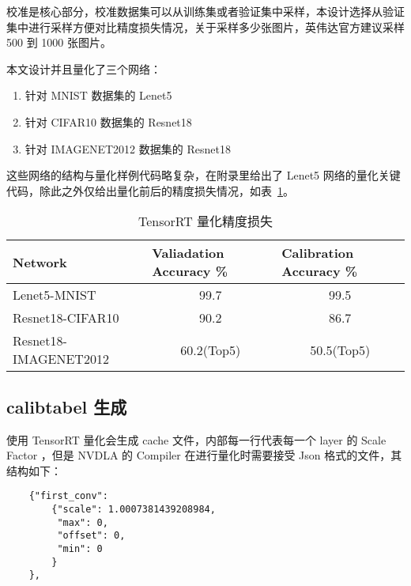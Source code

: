 校准是核心部分，校准数据集可以从训练集或者验证集中采样，本设计选择从验证集中进行采样方便对比精度损失情况，关于采样多少张图片，英伟达官方建议采样 500 到 1000 张图片。

本文设计并且量化了三个网络：

\begin{enumerate}
    \item 针对 MNIST 数据集的 Lenet5
    \item 针对 CIFAR10 数据集的 Resnet18
    \item 针对 IMAGENET2012 数据集的 Resnet18
\end{enumerate}

这些网络的结构与量化样例代码略复杂，在附录里给出了 Lenet5 网络的量化关键代码，除此之外仅给出量化前后的精度损失情况，如表~\ref{tab:Qualifications Report}。

\begin{table}[!htbp]
    \caption{TensorRT 量化精度损失}
    \label{tab:Qualifications Report}
    \centering
    \footnotesize%
    \setlength{\tabcolsep}{4pt}%
    \renewcommand{\arraystretch}{1.2}%
    \begin{tabular}{lcc}
        \toprule
        \textbf{Network}      & \multicolumn{1}{l}{\textbf{Valiadation Accuracy \%}} & \multicolumn{1}{l}{\textbf{Calibration Accuracy \%}} \\
        \midrule
        Lenet5-MNIST          & 99.7                                                 & 99.5                                                 \\
        Resnet18-CIFAR10      & 90.2                                                 & 86.7                                                 \\
        Resnet18-IMAGENET2012 & 60.2(Top5)                                           & 50.5(Top5)                                           \\
        \bottomrule                   
    \end{tabular}
\end{table}

\subsection{calibtabel 生成}

使用 TensorRT 量化会生成 cache 文件，内部每一行代表每一个 layer 的 Scale Factor ，但是 NVDLA 的 Compiler 在进行量化时需要接受 Json 格式的文件，其结构如下：

\begin{lstlisting}
    {"first_conv":
        {"scale": 1.0007381439208984,
         "max": 0,
         "offset": 0,
         "min": 0
        }
    },
\end{lstlisting}

